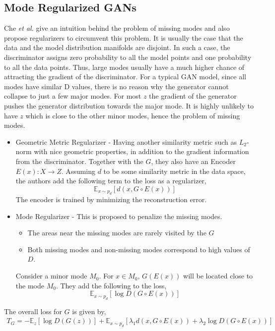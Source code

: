 \subsection*{Mode Regularized GANs \citep{modeReg}}
Che \textit{et al.} \citep{modeReg} give an intuition behind the problem of missing modes and also propose regularizers to circumvent this problem. 
It is usually the case that the data and the model distribution manifolds are disjoint. In such a case, the discriminator assigns zero probability to all the model points and one probability to all the data points. Thus, large modes usually have a much higher chance of attracting the gradient of the discriminator. For a typical GAN model, since all modes have similar D values, there is no reason why the generator cannot collapse to just a few major modes. For most $z$ the gradient of the generator pushes the generator distribution towards the major mode. It is highly unlikely to have $z$ which is close to the other minor modes, hence the problem of missing modes.
\begin{itemize}
\item Geometric Metric Regularizer - Having another similarity metric such as $L_{2}$-norm with nice geometric properties, in addition to the gradient information from the discriminator. Together with the $G$, they also have an Encoder $E(x) : X \rightarrow Z$. Assuming $d$ to be some similarity metric in the data space, the authors add the following term to the loss as a regularizer, $$\mathbb{E}_{x \sim p_{d}}[d(x, G\circ E(x))]$$
The encoder is trained by minimizing the reconstruction error.
\item Mode Regularizer - This is proposed to penalize the missing modes.
\begin{itemize}
\item The areas near the missing modes are rarely visited by the $G$
\item Both missing modes and non-missing modes correspond to high values of $D$. 
\end{itemize}
Consider a minor mode $M_{0}$. For $x\in M_{0}$, $G(E(x))$ will be located close to the mode $M_{0}$. They add the following to the loss,  $$\mathbb{E}_{x\sim p_{d}}[\log D(G \circ E(x))]$$
\end{itemize}
The overall loss for $G$ is given by, 
\begin{equation*}
    \begin{aligned}
    T_{G} = - \mathbb{E}_{z}[\log D(G(z))] 
    + \mathbb{E}_{x \sim p_{d}}[\lambda_{1} d(x, G\circ E(x)) + \lambda_{2}\log D(G \circ E(x))]
    \end{aligned}{}
\end{equation*}{}

